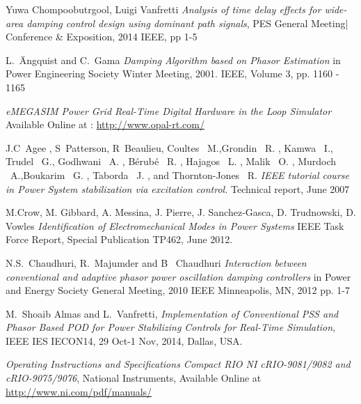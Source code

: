 \documentclass[journal]{IEEEtran}
\begin{document}
\begin{thebibliography}{1}
 Yuwa Chompoobutrgool, Luigi Vanfretti \emph{Analysis of time delay effects for wide-area damping control design using dominant path signals}, PES General Meeting| Conference \& Exposition, 2014 IEEE, pp 1-5

L.~\"{A}ngquist and C.~Gama  \emph{Damping Algorithm based on Phasor Estimation} in Power Engineering Society Winter Meeting, 2001. IEEE, Volume 3, pp. 1160 - 1165  

 \emph{eMEGASIM Power Grid Real-Time Digital Hardware in the Loop Simulator} Available Online at : \url{http://www.opal-rt.com/}

  


 J.C~Agee , S~Patterson, R~Beaulieu, Coultes \ M.,Grondin \ R. , Kamwa \ I.,
Trudel \ G., Godhwani \ A. , Bérubé \ R. , Hajagos \ L. , Malik \ O. , Murdoch \ A.,Boukarim \ G. , Taborda \ J. , and Thornton-Jones \ R. \emph{IEEE tutorial course in Power System stabilization via excitation control.} Technical report, June 2007


 M.Crow, M. Gibbard, A. Messina, J. Pierre, J. Sanchez-Gasca, D. Trudnowski, D. Vowles \emph{Identification of Electromechanical Modes in Power Systems} IEEE Task Force Report, Special Publication TP462, June 2012.

 N.S.~Chaudhuri, R.~Majumder and B~ Chaudhuri \emph{Interaction between conventional and adaptive phasor power oscillation damping controllers} in Power and Energy Society General Meeting, 2010 IEEE Minneapolis, MN, 2012 pp. 1-7
  
 M.~Shoaib Almas and L.~Vanfretti, \emph{Implementation of Conventional PSS and Phasor Based POD for Power Stabilizing Controls for Real-Time Simulation}, IEEE IES IECON14, 29 Oct-1 Nov, 2014, Dallas, USA.

 \emph{Operating Instructions and Specifications Compact RIO NI cRIO-9081/9082 and cRIO-9075/9076}, National Instruments, Available Online at \url{http://www.ni.com/pdf/manuals/}


\end{thebibliography}
\end{document}
